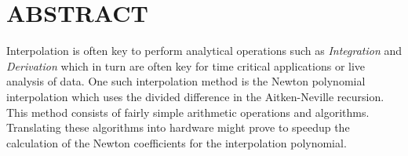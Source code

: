 \section*{ABSTRACT}

Interpolation is often key to perform analytical operations such as
\textit{Integration} and \textit{Derivation} which in turn are often key for
time critical applications or live analysis of data. One such interpolation
method is the Newton polynomial interpolation which uses the divided
difference in the Aitken-Neville recursion. This method consists of fairly
simple arithmetic operations and algorithms. Translating these algorithms into
hardware might prove to speedup the calculation of the Newton coefficients for
the interpolation polynomial.
